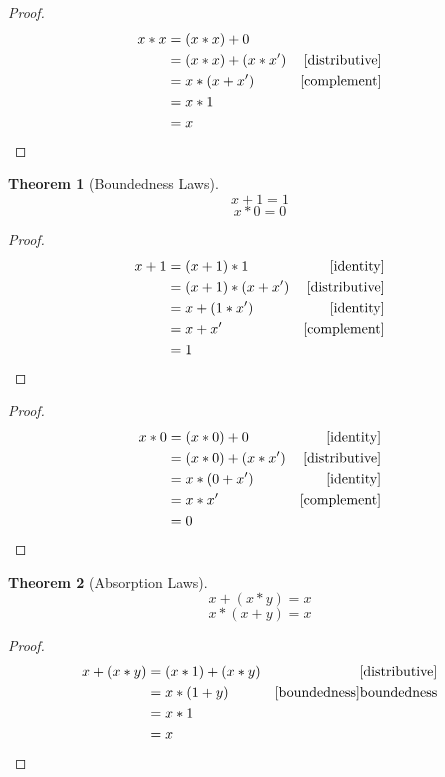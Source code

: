 \documentclass{article}
\newtheorem{theorem}{Theorem}[section]
\begin{document}
\begin{proof}
\begin{align*}
x * x & = (x * x) + 0 \\
      & = (x * x) + (x * x') & \ref{distributive} \\
      & = x * (x + x')       & \ref{complement} \\
      & = x * 1 \\
      & = x
\end{align*}
\end{proof}

\newpage
\begin{theorem}[Boundedness Laws]
\label{boundedness}
\[ x + 1 = 1 \]
\[ x * 0 = 0 \]
\end{theorem}

\begin{proof}
\begin{align*}
x + 1 & = (x + 1) * 1        & \ref{identity} \\
      & = (x + 1) * (x + x') & \ref{distributive} \\
      & = x + (1 * x')       & \ref{identity} \\
      & = x + x'             & \ref{complement} \\
      & = 1
\end{align*}
\end{proof}

\begin{proof}
\begin{align*}
x * 0 & = (x * 0) + 0        & \ref{identity}  \\
      & = (x * 0) + (x * x') & \ref{distributive} \\
      & = x * (0 + x')       & \ref{identity} \\
      & = x * x'             & \ref{complement} \\
      & = 0
\end{align*}
\end{proof}

\newpage
\begin{theorem}[Absorption Laws]
\label{absorption}
\[ x + (x * y) = x \]
\[ x * (x + y) = x \]
\end{theorem}

\begin{proof}
\begin{align*}
x + (x * y) & = (x * 1) + (x * y) & \ref{distributive} \\
            & = x * (1 + y)       & \ref{boundedness} \text{boundedness} \\
            & = x * 1 \\
            & = x
\end{align*}
\end{proof}
\end{document}
